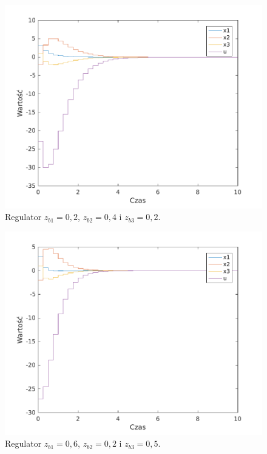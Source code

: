 \begin{figure}[H]
\centering
 \includegraphics[width=\textwidth]{img/plot4.pdf}
\caption{Regulator $z_{b1}=0,2$, $z_{b2}=0,4$ i $z_{b3}=0,2$.}
\end{figure}

\begin{figure}[H]
\centering
 \includegraphics[width=\textwidth]{img/plot5.pdf}
\caption{Regulator $z_{b1}=0,6$, $z_{b2}=0,2$ i $z_{b3}=0,5$.}
\end{figure}

